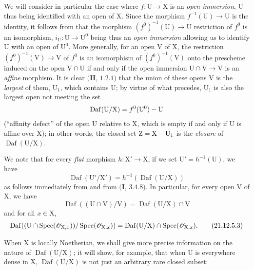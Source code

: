 \begin{env}[21.12.5]
\label{IV.21.12.5}
We will consider in particular the case where $f:\mathrm{U}\to\mathrm{X}$ is an \emph{open immersion}, $\mathrm{U}$ thus being identified with an open of $\mathrm{X}$.
Since the morphism $f^{-1}(\mathrm{U})\to\mathrm{U}$ is the identity, it follows from  that the morphism $(f^0)^{-1}(\mathrm{U})\to\mathrm{U}$ restriction of $f^0$ is an isomorphism, $i_{\mathrm{U}}:\mathrm{U}\to\mathrm{U}^0$ being thus an \emph{open immersion} allowing us to identify $\mathrm{U}$ with an open of $\mathrm{U}^0$.
More generally, for an open $\mathrm{V}$ of $\mathrm{X}$, the restriction $(f^0)^{-1}(\mathrm{V})\to\mathrm{V}$ of $f^0$ is an isomorphism of $(f^0)^{-1}(\mathrm{V})$ onto the prescheme induced on the open $\mathrm{V}\cap\mathrm{U}$ if and only if the open immersion $\mathrm{U}\cap\mathrm{V}\to\mathrm{V}$ is an \emph{affine} morphism.
It is clear $(\mathbf{II}$, $1.2.1)$
that the union of these opens $\mathrm{V}$ is the \emph{largest} of them, $\mathrm{U}_1$, which contains $\mathrm{U}$; by virtue of what precedes, $\mathrm{U}_1$ is also the largest open not meeting the set
\[
  \operatorname{Daf}(\mathrm{U}/\mathrm{X})=f^0(\mathrm{U}^0)-\mathrm{U}
\]
(``affinity defect'' of the open $\mathrm{U}$ relative to $\mathrm{X}$, which is empty if and only if $\mathrm{U}$ is affine over $\mathrm{X}$); in other words, the closed set $\mathrm{Z}=\mathrm{X}-\mathrm{U}_1$ is the \emph{closure} of $\operatorname{Daf}(\mathrm{U}/\mathrm{X})$.

We note that for every \emph{flat} morphism $h:\mathrm{X}'\to\mathrm{X}$, if we set $\mathrm{U}'=h^{-1}(\mathrm{U})$, we have
\[
\label{IV.21.12.5.1}
  \operatorname{Daf}(\mathrm{U}'/\mathrm{X}')=h^{-1}(\operatorname{Daf}(\mathrm{U}/\mathrm{X}))
  \tag{21.12.5.1}
\]
as follows immediately from  and from $(\mathbf{I}$, $3.4.8)$.
In particular, for every open $\mathrm{V}$ of $\mathrm{X}$, we have
\[
\label{IV.21.12.5.2}
  \operatorname{Daf}((\mathrm{U}\cap\mathrm{V})/\mathrm{V})=\operatorname{Daf}(\mathrm{U}/\mathrm{X})\cap\mathrm{V}
  \tag{21.12.5.2}
\]
and for all $x\in\mathrm{X}$,
\[
\label{IV.21.12.5.3}
  \operatorname{Daf}((\mathrm{U}\cap\operatorname{Spec}(\mathscr{O}_{\mathrm{X},x}))/\operatorname{Spec}(\mathscr{O}_{\mathrm{X},x}))=\operatorname{Daf}(\mathrm{U}/\mathrm{X})\cap\operatorname{Spec}(\mathscr{O}_{\mathrm{X},x}).
  \tag{21.12.5.3}
\]
\end{env}

When $\mathrm{X}$ is locally Noetherian, we shall give more precise information on the nature of $\operatorname{Daf}(\mathrm{U}/\mathrm{X})$; it will show, for example, that when $\mathrm{U}$ is everywhere dense in $\mathrm{X}$, $\operatorname{Daf}(\mathrm{U}/\mathrm{X})$ is not just an arbitrary rare closed subset:

